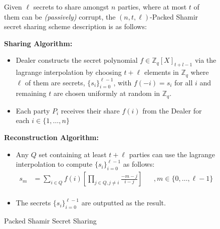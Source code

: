 \begin{figure}[ht]
    \centering
    \begin{tcolorbox}[title=\textbf{Packed Shamir Secret Sharing}, width=0.9\textwidth, colframe=blue!75!black, colback=blue!10, sharp corners]
        Given $\ell$ secrets to share amongst $n$ parties, where at most $t$ of them can
        be \textit{(passively)} corrupt, the $(n,t,\ell)$-Packed Shamir secret sharing scheme description is as
        follows:
        
        \vspace{0.5em}
        \textbf{Sharing Algorithm:}
        \begin{itemize}
            \item Dealer constructs the secret polynomial $f\in\mathbb{Z}_q[X]_{t+l-1}$
                  via the lagrange interpolation by choosing $t+\ell$ elements in 
                  $\mathbb{Z}_q$ where $\ell$ of them are secrets, $\{s_i\}_{i=0}^{\ell-1}$, with
                  $f(-i)=s_i$ for all $i$ and remaining $t$ are chosen uniformly 
                  at random in $\mathbb{Z}_q$.
            \item Each party $P_i$ receives their share $f(i)$ from the Dealer
                  for each $i\in\{1,\dots,n\}$
        \end{itemize}
        
        \vspace{0.5em}
        \textbf{Reconstruction Algorithm:}
        \begin{itemize}
            \item Any $Q$ set containing at least $t+\ell$ parties can use the 
            lagrange interpolation to compute $\{s_i\}_{i=0}^{\ell-1}$ as follows:
            \begin{align*}
                s_m &= \sum_{i\in Q} f(i) \left[\prod_{j\in Q, j\neq i}\frac{-m-j}{i-j}\right] &&, m\in\{0,\dots,\ell-1\} \\
            \end{align*}
            \item The secrets $\{s_i\}_{i=0}^{\ell-1}$ are outputted as the result.
        \end{itemize}
    \end{tcolorbox}
    \caption{Packed Shamir Secret Sharing}
    \label{fig:packed-shamir}
\end{figure}